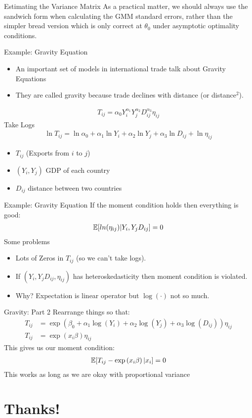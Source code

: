 \begin{frame}{Estimating the Variance Matrix}
 As a practical matter, we should always use the \alert{sandwich} form when calculating the GMM standard errors, rather than the simpler \alert{bread} version which is only correct at $\theta_0$ under asymptotic optimality conditions.
\end{frame}


\begin{frame}{Example: Gravity Equation}
\begin{itemize}
\item An important set of models in international trade talk about \alert{Gravity Equations}
\item They are called gravity because trade declines with distance (or distance$^2$).
\end{itemize}
\begin{align*}
T_{ij}  = \alpha_0 Y_i^{\alpha_1} Y_j^{\alpha_2} D_{ij}^{\alpha_3} \eta_{ij}
\end{align*}
Take Logs
\begin{align*}
\ln T_{ij}  =  \ln \alpha_0  +\alpha_1 \ln Y_i + \alpha_2 \ln Y_j + \alpha_3 \ln D_{ij} + \ln \eta_{ij}
\end{align*}
\begin{itemize}
\item $T_{ij}$  (Exports from $i$ to $j$)
\item $(Y_i,Y_j)$ GDP of each country
\item $D_{ij}$ distance between two countries
\end{itemize}
\end{frame}


\begin{frame}{Example: Gravity Equation}
If the moment condition holds then everything is good:
\begin{align*}
\mathbb{E}[ln (\eta_{ij}) | Y_i, Y_j D_{ij} ]=0
\end{align*}
Some problems
\begin{itemize}
\item Lots of Zeros in $T_{ij}$ (so we can't take logs).
\item If $( Y_i, Y_j D_{ij},\eta_{ij})$ has heteroskedasticity then moment condition is violated.
\item Why?  Expectation is \alert{linear operator} but $\log(\cdot)$ not so much.
\end{itemize}
\end{frame}

\begin{frame}{Gravity: Part 2}
Rearrange things so that:
\begin{align*}
T_{i j}&=\exp \left(\beta_{0}+\alpha_{1} \log \left(Y_{i}\right)+\alpha_{2} \log \left(Y_{j}\right)+\alpha_{3} \log \left(D_{i j}\right)\right) \eta_{i j} \\
T_{i j}&=\exp \left(x_{i} \beta\right) \eta_{i j}
\end{align*}
This gives us our moment condition:
\begin{align*}
\mathbb{E}[ T_{i j} - \exp \left(x_{i} \beta\right) | x_i]=0
\end{align*}
This works as long as we are okay with \alert{proportional variance}

\end{frame}
\section*{Thanks!}

